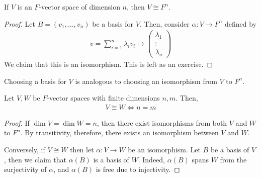 \begin{theorem}
    If $V$ is an $F$-vector space of dimension $n$, then $V \cong F^n$.
\end{theorem}
\begin{proof}
    Let $B = (v_1, \dots, v_n)$ be a basis for $V$.
    Then, consider $\alpha \colon V \to F^n$ defined by
    \begin{align*}
        v = \sum_{i=1}^n \lambda_i v_i \mapsto \begin{pmatrix}\lambda_1 \\ \vdots \\ \lambda_n \end{pmatrix}
    \end{align*}
    We claim that this is an isomorphism.
    This is left as an exercise.
\end{proof}
\begin{remark}
    Choosing a basis for $V$ is analogous to choosing an isomorphism from $V$ to $F^n$.
\end{remark}
\begin{theorem}
    Let $V, W$ be $F$-vector spaces with finite dimensions $n, m$.
    Then,
    \begin{align*}
        V \cong W \iff n = m
    \end{align*}
\end{theorem}
\begin{proof}
    If $\dim V = \dim W = n$, then there exist isomorphisms from both $V$ and $W$ to $F^n$.
    By transitivity, therefore, there exists an isomorphism between $V$ and $W$.

    Conversely, if $V \cong W$ then let $\alpha \colon V \to W$ be an isomorphism.
    Let $B$ be a basis of $V$, then we claim that $\alpha(B)$ is a basis of $W$.
    Indeed, $\alpha(B)$ spans $W$ from the surjectivity of $\alpha$, and $\alpha(B)$ is free due to injectivity.
\end{proof}

